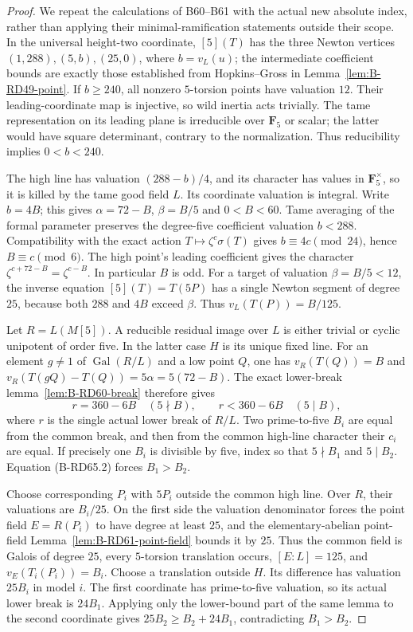\begin{proof}
We repeat the calculations of B60--B61 with the actual new absolute
index, rather than applying their minimal-ramification statements
outside their scope. In the universal height-two coordinate,
$[5](T)$ has the three Newton vertices
$(1,288),(5,b),(25,0)$, where $b=v_L(u)$; the intermediate coefficient
bounds are exactly those established from Hopkins--Gross in
Lemma~\ref{lem:B-RD49-point}. If $b\ge240$, all nonzero $5$-torsion
points have valuation $12$. Their leading-coordinate map is injective,
so wild inertia acts trivially. The tame representation on its
leading plane is irreducible over $\mathbf F_5$ or scalar; the latter
would have square determinant, contrary to the normalization. Thus
reducibility implies $0<b<240$.

The high line has valuation $(288-b)/4$, and its character has values
in $\mathbf F_5^\times$, so it is killed by the tame good field $L$.
Its coordinate valuation is integral. Write $b=4B$; this gives
$\alpha=72-B$, $\beta=B/5$ and $0<B<60$. Tame averaging of the
formal parameter preserves the degree-five coefficient valuation
$b<288$. Compatibility with the exact action $T\mapsto\zeta^c\sigma(T)$
gives $b\equiv4c\pmod{24}$, hence $B\equiv c\pmod6$.
The high point's leading coefficient gives the character
$\zeta^{c+72-B}=\zeta^{c-B}$. In particular $B$ is odd.
For a target of valuation $\beta=B/5<12$, the inverse equation
$[5](T)=T(5P)$ has a single Newton segment of degree $25$, because
both $288$ and $4B$ exceed $\beta$. Thus $v_L(T(P))=B/125$.

Let $R=L(M[5])$. A reducible residual image over $L$ is either
trivial or cyclic unipotent of order five. In the latter case $H$
is its unique fixed line. For an element $g\ne1$ of
$\operatorname{Gal}(R/L)$ and a low point $Q$, one has
$v_R(T(Q))=B$ and
$v_R(T(gQ)-T(Q))=5\alpha=5(72-B)$.
The exact lower-break lemma~\ref{lem:B-RD60-break} therefore gives
\[
 r=360-6B\quad(5\nmid B),\qquad
 r<360-6B\quad(5\mid B),                              \tag{B-RD65.2}
\]
where $r$ is the single actual lower break of $R/L$.
Two prime-to-five $B_i$ are equal from the common break, and then
from the common high-line character their $c_i$ are equal.
If precisely one $B_i$ is divisible by five, index so that
$5\nmid B_1$ and $5\mid B_2$. Equation (B-RD65.2) forces $B_1>B_2$.

Choose corresponding $P_i$ with $5P_i$ outside the common high line.
Over $R$, their valuations are $B_i/25$. On the first side the
valuation denominator forces the point field $E=R(P_i)$ to have
degree at least $25$, and the elementary-abelian point-field
Lemma~\ref{lem:B-RD61-point-field} bounds it by $25$.
Thus the common field is Galois of degree $25$, every $5$-torsion
translation occurs, $[E:L]=125$, and $v_E(T_i(P_i))=B_i$.
Choose a translation outside $H$. Its difference has valuation
$25B_i$ in model $i$. The first coordinate has prime-to-five
valuation, so its actual lower break is $24B_1$. Applying only the
lower-bound part of the same lemma to the second coordinate gives
$25B_2\ge B_2+24B_1$, contradicting $B_1>B_2$.


\end{proof}
